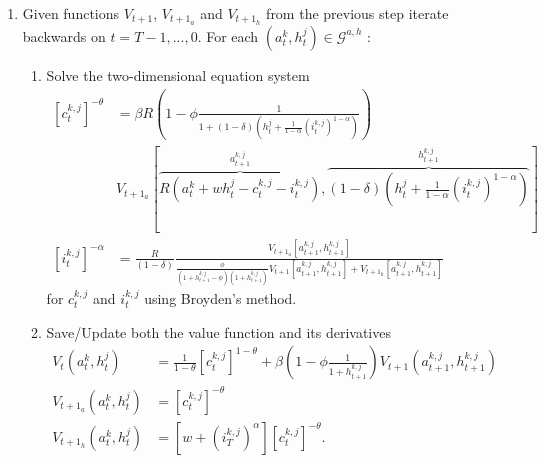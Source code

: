 \documentclass[a4paper,12pt]{article}%
\begin{document}
\begin{enumerate}
\item Given functions $V_{t+1}$, $V_{t+1_{a}}$ and $V_{t+1_{h}}$ from the previous step iterate backwards on $t=T-1,...,0$. For each $\left( a_{t}^{k},h_{t}^{j}\right) \in\mathcal{G}^{a,h}$ :

\begin{enumerate}
\item \label{EXGM interp} Solve the two-dimensional equation system
\begin{align*}
\left[ c_{t}^{k,j}\right]^{-\theta}  &  =\beta R\left( 1-\phi\frac{1}{1+\left( 1-\delta\right) \left(  h_{t}^{j}+\frac{1}{1-\alpha}\left(i_{t}^{k,j}\right)^{1-\alpha}\right)}\right) \\
&  \text{$V_{t+1_{a}}$}\left[\overset{a_{t+1}^{k,j}}{\overbrace{R\left(a_{t}^{k}+wh_{t}^{j}-c_{t}^{k,j}-i_{t}^{k,j}\right)}},\overset{h_{t+1}^{k,j}}{\overbrace{\left( 1-\delta\right) \left( h_{t}^{j}+\frac{1}{1-\alpha}\left( i_{t}^{k,j}\right)^{1-\alpha}\right)}}\right] \\
\left[ i_{t}^{k,j}\right]^{-\alpha}  &  =\frac{R}{\left( 1-\delta\right)}\frac{\text{$V_{t+1_{a}}$}\left[ a_{t+1}^{k,j},h_{t+1}^{k,j}\right]}{\frac{\phi}{\left( 1+h_{t+1}^{k,j}-\phi\right) \left( 1+h_{t+1}^{k,j}\right)}V_{t+1}\left[ a_{t+1}^{k,j},h_{t+1}^{k,j}\right]+\text{$V_{t+1_{h}}$}\left[  a_{t+1}^{k,j},h_{t+1}^{k,j}\right]}
\end{align*}
for $c_{t}^{k,j}$ and $i_{t}^{k,j}$ using Broyden's method.

\item Save/Update both the value function and its derivatives
\begin{align*}
V_{t}\left( a_{t}^{k},h_{t}^{j}\right)  &  =\frac{1}{1-\theta}\left[c_{t}^{k,j}\right]^{1-\theta}+\beta\left( 1-\phi\frac{1}{1+h_{t+1}^{k,j}}\right) V_{t+1}(a_{t+1}^{k,j},h_{t+1}^{k,j})\\
\text{$V_{t+1_{a}}$}\left( a_{t}^{k},h_{t}^{j}\right)  &  =\left[ c_{t}^{k,j}\right]^{-\theta}\\
\text{$V_{t+1_{h}}$}\left( a_{t}^{k},h_{t}^{j}\right)  &  =\left[ w+\left( i_{T}^{k,j}\right)^{\alpha} \right] \left[  c_{t}^{k,j}\right]^{-\theta}\text{.}
\end{align*}

\end{enumerate}
\end{enumerate}
\end{document}
